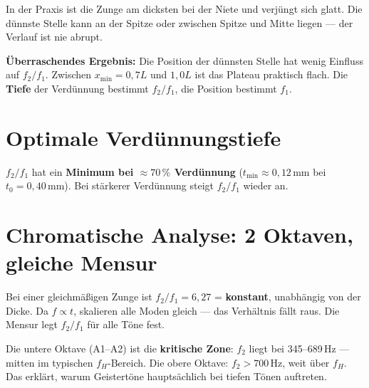 \documentclass[11pt,a4paper]{article}
\begin{document}
In der Praxis ist die Zunge am dicksten bei der Niete und verjüngt sich glatt.
Die dünnste Stelle kann an der Spitze oder zwischen Spitze und Mitte liegen ---
der Verlauf ist nie abrupt.

\textbf{Überraschendes Ergebnis:} Die Position der dünnsten Stelle hat wenig
Einfluss auf $f_2/f_1$. Zwischen $x_\mathrm{min} = 0{,}7L$ und $1{,}0L$ ist
das Plateau praktisch flach. Die \textbf{Tiefe} der Verdünnung bestimmt
$f_2/f_1$, die Position bestimmt $f_1$.

\section{Optimale Verdünnungstiefe}

$f_2/f_1$ hat ein \textbf{Minimum bei $\approx 70\,\%$ Verdünnung}
($t_\mathrm{min} \approx 0{,}12$\,mm bei $t_0 = 0{,}40$\,mm). Bei stärkerer
Verdünnung steigt $f_2/f_1$ wieder an.

\begin{center}
\end{center}

\section{Chromatische Analyse: 2 Oktaven, gleiche Mensur}

Bei einer gleichmäßigen Zunge ist $f_2/f_1 = 6{,}27$ = \textbf{konstant},
unabhängig von der Dicke. Da $f \propto t$, skalieren alle Moden gleich ---
das Verhältnis fällt raus. Die Mensur legt $f_2/f_1$ für alle Töne fest.

Die untere Oktave (A1--A2) ist die \textbf{kritische Zone}: $f_2$ liegt bei
345--689\,Hz --- mitten im typischen $f_H$-Bereich. Die obere Oktave: $f_2 > 700$\,Hz,
weit über $f_H$. Das erklärt, warum Geistertöne hauptsächlich bei tiefen Tönen auftreten.
\end{document}
